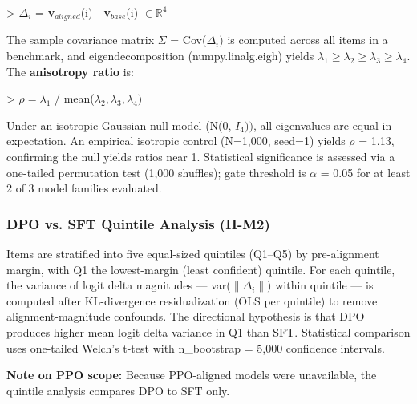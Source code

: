 > $\Delta _i$ = \textbf{v}$_{aligned}$(i) - \textbf{v}$_{base}$(i) $\in \mathbb{R}^4$

The sample covariance matrix $\Sigma$ = Cov(${\Delta _{i}})$ is computed across all items in a benchmark, and eigendecomposition (numpy.linalg.eigh) yields $\lambda _1 \geq \lambda _2 \geq \lambda _3 \geq \lambda _4$. The \textbf{anisotropy ratio} is:

> $\rho = \lambda _1$ / mean($\lambda _2, \lambda _3, \lambda _{4})$

Under an isotropic Gaussian null model (N(0, $I_{4}))$, all eigenvalues are equal in expectation. An empirical isotropic control (N=1,000, seed=1) yields $\rho$ = 1.13, confirming the null yields ratios near 1. Statistical significance is assessed via a one-tailed permutation test (1,000 shuffles); gate threshold is $\alpha$ = 0.05 for at least 2 of 3 model families evaluated.

\subsubsection{DPO vs. SFT Quintile Analysis (H-M2)}

Items are stratified into five equal-sized quintiles (Q1--Q5) by pre-alignment margin, with Q1 the lowest-margin (least confident) quintile. For each quintile, the variance of logit delta magnitudes --- var($\|\Delta _{i}\|)$ within quintile --- is computed after KL-divergence residualization (OLS per quintile) to remove alignment-magnitude confounds. The directional hypothesis is that DPO produces higher mean logit delta variance in Q1 than SFT. Statistical comparison uses one-tailed Welch's t-test with n\_bootstrap = 5,000 confidence intervals.

\textbf{Note on PPO scope:} Because PPO-aligned models were unavailable, the quintile analysis compares DPO to SFT only.

